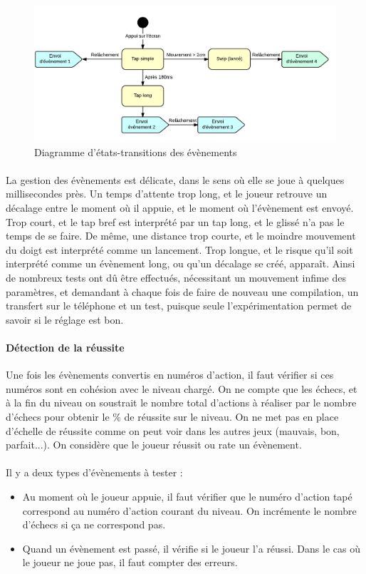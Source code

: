 \begin{figure}[!htb]\centering
  \includegraphics[scale=0.7]{./img/diagEtatTransition.png}
  \caption{Diagramme d'états-transitions des évènements}
  \label{diagetattrans}
\end{figure}


\paragraph{}
La gestion des évènements est délicate, dans le sens où elle se joue à quelques millisecondes près. Un temps d'attente trop long, et le joueur retrouve un décalage entre le moment où il appuie, et le moment où l'évènement est envoyé. Trop court, et le tap bref est interprété par un tap long, et le glissé n'a pas le temps de se faire. De même, une distance trop courte, et le moindre mouvement du doigt est interprété comme un lancement. Trop longue, et le risque qu'il soit interprété comme un évènement long, ou qu'un décalage se créé, apparaît. Ainsi de nombreux tests ont dû être effectués, nécessitant un mouvement infime des paramètres, et demandant à chaque fois de faire de nouveau une compilation, un transfert sur le téléphone et un test, puisque seule l'expérimentation permet de savoir si le réglage est bon.

\paragraph{Détection de la réussite}
Une fois les évènements convertis en numéros d'action, il faut vérifier si ces numéros sont en cohésion avec le niveau chargé. On ne compte que les échecs, et à la fin du niveau on soustrait le nombre total d'actions à réaliser par le nombre d'échecs pour obtenir le \% de réussite sur le niveau.
On ne met pas en place d'échelle de réussite comme on peut voir dans les autres jeux (mauvais, bon, parfait...). On considère que le joueur réussit ou rate un évènement.\\\\
Il y a deux types d'évènements à tester :
\begin{itemize}
\item Au moment où le joueur appuie, il faut vérifier que le numéro d'action tapé correspond au numéro d'action courant du niveau. On incrémente le nombre d'échecs si ça ne correspond pas.
\item Quand un évènement est passé, il vérifie si le joueur l'a réussi. Dans le cas où le joueur ne joue pas, il faut compter des erreurs.
\end{itemize}
